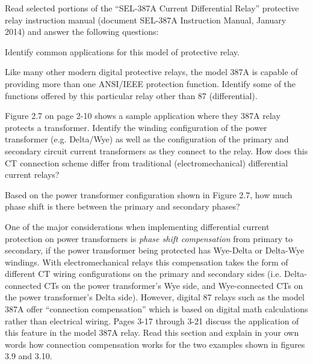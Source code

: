 

Read selected portions of the ``SEL-387A Current Differential Relay'' protective relay instruction manual (document SEL-387A Instruction Manual, January 2014) and answer the following questions:

\vskip 10pt

Identify common applications for this model of protective relay.

\vskip 10pt

Like many other modern digital protective relays, the model 387A is capable of providing more than one ANSI/IEEE protection function.  Identify some of the functions offered by this particular relay other than 87 (differential).

\vskip 10pt

Figure 2.7 on page 2-10 shows a sample application where they 387A relay protects a transformer.  Identify the winding configuration of the power transformer (e.g. Delta/Wye) as well as the configuration of the primary and secondary circuit current transformers as they connect to the relay.  How does this CT connection scheme differ from traditional (electromechanical) differential current relays?

\vskip 10pt

Based on the power transformer configuration shown in Figure 2.7, how much phase shift is there between the primary and secondary phases?

\vskip 10pt

One of the major considerations when implementing differential current protection on power transformers is {\it phase shift compensation} from primary to secondary, if the power transformer being protected has Wye-Delta or Delta-Wye windings.  With electromechanical relays this compensation takes the form of different CT wiring configurations on the primary and secondary sides (i.e. Delta-connected CTs on the power transformer's Wye side, and Wye-connected CTs on the power transformer's Delta side).  However, digital 87 relays such as the model 387A offer ``connection compensation'' which is based on digital math calculations rather than electrical wiring.  Pages 3-17 through 3-21 discuss the application of this feature in the model 387A relay.  Read this section and explain in your own words how connection compensation works for the two examples shown in figures 3.9 and 3.10.

